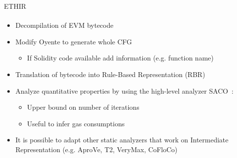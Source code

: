 \begin{frame}{ETHIR}
\framesubtitle{\cite{bib:ETHIR}}
	\begin{itemize}
		\item Decompilation of EVM bytecode
		\item Modify Oyente to generate whole CFG
		\begin{itemize}
			\item If Solidity code available add information (e.g. function
			name)
		\end{itemize}
		\item Translation of bytecode into Rule-Based Representation (RBR)
		\item Analyze quantitative properties by using the high-level analyzer
		SACO~\cite{bib:SACO}:
		\begin{itemize}
			\item Upper bound on number of iterations
			\item Useful to infer gas consumptions
		\end{itemize}
		\item It is possible to adapt other static analyzers that work on
		Intermediate Representation (e.g. AproVe, T2, VeryMax, CoFloCo)
	\end{itemize}
\end{frame}
